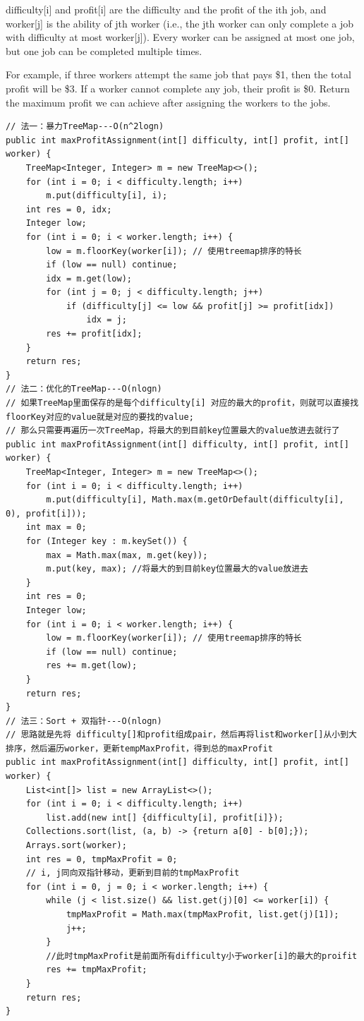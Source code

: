 \documentclass[9pt, b5paaper]{book}
\begin{document}
difficulty[i] and profit[i] are the difficulty and the profit of the ith job, and
worker[j] is the ability of jth worker (i.e., the jth worker can only complete a job with difficulty at most worker[j]).
Every worker can be assigned at most one job, but one job can be completed multiple times.

For example, if three workers attempt the same job that pays \$1, then the total profit will be \$3. If a worker cannot complete any job, their profit is \$0.
Return the maximum profit we can achieve after assigning the workers to the jobs.
\begin{verbatim}
// 法一：暴力TreeMap---O(n^2logn)
public int maxProfitAssignment(int[] difficulty, int[] profit, int[] worker) {
    TreeMap<Integer, Integer> m = new TreeMap<>();
    for (int i = 0; i < difficulty.length; i++) 
        m.put(difficulty[i], i);
    int res = 0, idx;
    Integer low;
    for (int i = 0; i < worker.length; i++) {
        low = m.floorKey(worker[i]); // 使用treemap排序的特长
        if (low == null) continue;
        idx = m.get(low);
        for (int j = 0; j < difficulty.length; j++) 
            if (difficulty[j] <= low && profit[j] >= profit[idx])
                idx = j;
        res += profit[idx];
    }
    return res;
}
// 法二：优化的TreeMap---O(nlogn)
// 如果TreeMap里面保存的是每个difficulty[i] 对应的最大的profit，则就可以直接找floorKey对应的value就是对应的要找的value;
// 那么只需要再遍历一次TreeMap，将最大的到目前key位置最大的value放进去就行了
public int maxProfitAssignment(int[] difficulty, int[] profit, int[] worker) {
    TreeMap<Integer, Integer> m = new TreeMap<>();
    for (int i = 0; i < difficulty.length; i++) 
        m.put(difficulty[i], Math.max(m.getOrDefault(difficulty[i], 0), profit[i]));
    int max = 0;
    for (Integer key : m.keySet()) { 
        max = Math.max(max, m.get(key));
        m.put(key, max); //将最大的到目前key位置最大的value放进去
    }
    int res = 0;
    Integer low;
    for (int i = 0; i < worker.length; i++) {
        low = m.floorKey(worker[i]); // 使用treemap排序的特长
        if (low == null) continue;
        res += m.get(low);
    }
    return res;
}
// 法三：Sort + 双指针---O(nlogn)
// 思路就是先将 difficulty[]和profit组成pair，然后再将list和worker[]从小到大排序，然后遍历worker，更新tempMaxProfit，得到总的maxProfit
public int maxProfitAssignment(int[] difficulty, int[] profit, int[] worker) {
    List<int[]> list = new ArrayList<>();
    for (int i = 0; i < difficulty.length; i++) 
        list.add(new int[] {difficulty[i], profit[i]});
    Collections.sort(list, (a, b) -> {return a[0] - b[0];});
    Arrays.sort(worker);
    int res = 0, tmpMaxProfit = 0;
    // i, j同向双指针移动，更新到目前的tmpMaxProfit
    for (int i = 0, j = 0; i < worker.length; i++) {
        while (j < list.size() && list.get(j)[0] <= worker[i]) {
            tmpMaxProfit = Math.max(tmpMaxProfit, list.get(j)[1]);
            j++;
        }
        //此时tmpMaxProfit是前面所有difficulty小于worker[i]的最大的proifit
        res += tmpMaxProfit;
    }
    return res;
}
\end{verbatim}
\end{document}
